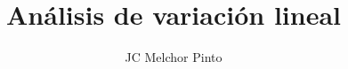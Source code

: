 \documentclass[12pt,addpoints,answers]{guia}
\title{Análisis de variación lineal}
\author{JC Melchor Pinto}
\begin{document}
\INFO%
\ejemplosboxed[]
\begin{questions}
    \questionboxed[10]{}
    \questionboxed[15]{}
    \questionboxed[15]{}
    \questionboxed[15]{}
    \questionboxed[15]{}
    \questionboxed[15]{}
    \questionboxed[15]{}
\end{questions}
\end{document}
